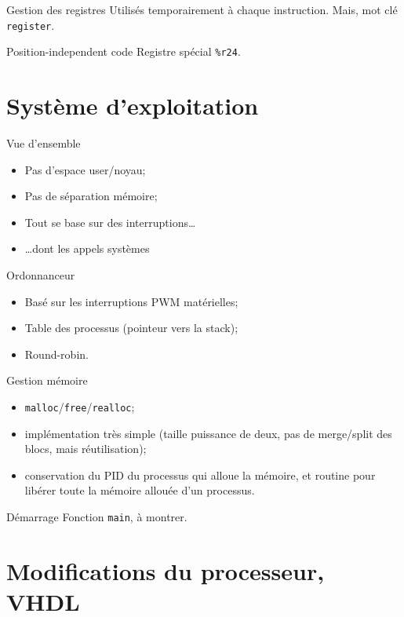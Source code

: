 \documentclass{beamer}
\begin{document}
    \begin{frame}[fragile]{Gestion des registres}
      Utilisés temporairement à chaque instruction. Mais, mot clé
      \verb+register+.
\end{frame}

    \begin{frame}[fragile]{Position-independent code}
      Registre spécial \verb+%r24+.
\end{frame}

  \section{Système d'exploitation}
    \begin{frame}[fragile]{Vue d'ensemble}
      \begin{itemize}
        \item Pas d'espace user/noyau;
        \item Pas de séparation mémoire;
        \item Tout se base sur des interruptions\dots
        \item \dots dont les appels systèmes
      \end{itemize}
\end{frame}

    \begin{frame}[fragile]{Ordonnanceur}
      \begin{itemize}
        \item Basé sur les interruptions PWM matérielles;
        \item Table des processus (pointeur vers la stack);
        \item Round-robin.
      \end{itemize}
\end{frame}

    \begin{frame}[fragile]{Gestion mémoire}
      \begin{itemize}
        \item \verb+malloc+/\verb+free+/\verb+realloc+;
        \item implémentation très simple (taille puissance de deux, pas de
          merge/split des blocs, mais réutilisation);
        \item conservation du PID du processus qui alloue la mémoire, et routine
          pour libérer toute la mémoire allouée d'un processus.
      \end{itemize}
\end{frame}

    \begin{frame}[fragile]{Démarrage}
        Fonction \verb+main+, à montrer.
\end{frame}

  \section{Modifications du processeur, VHDL}
\end{document}
